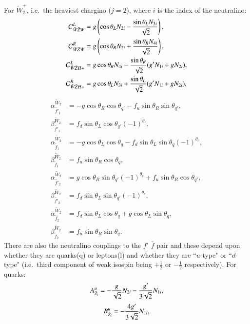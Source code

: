 \documentclass[final,3p,times]{elsarticle}
\begin{document}
For $\tilde{W}^{+}_{2}$, i.e.\ the heaviest chargino ($j = 2$), where $i$ is the index of the neutralino:
\begin{align}
\mathcal{C}_{\tilde{W} \tilde{Z} W}^L &= g\left(\cos\theta_L N_{2i} -
                                        {\sin\theta_L N_{3i} \over \sqrt{2}} \right), \\
\mathcal{C}_{\tilde{W} \tilde{Z} W}^R &= g\left(\cos\theta_R N_{2i} + {\sin\theta_R N_{4i} \over \sqrt{2}}\right), \\
\mathcal{C}_{\tilde{W} \tilde{Z} H+}^L &= g\cos\theta_R N_{4i} - {\sin\theta_R \over \sqrt{2}}(g' N_{1i} + g N_{2i}), \\
\mathcal{C}_{\tilde{W} \tilde{Z} H+}^R &= g\cos\theta_L N_{3i} + {\sin\theta_L \over \sqrt{2}}(g' N_{1i} + g N_{2i}),
\end{align}
\begin{align}
\alpha_{\tilde{f'}_1}^{\tilde{W}_2} &= -g \cos\theta_R \cos\theta_{q'} - f_{u}\sin\theta_{R}\sin\theta_{q'}, \\
\beta_{\tilde{f'}_1}^{\tilde{W}_2} &= f_{d}\sin\theta_L \cos\theta_{q'}(-1)^{\theta_c}, \\
\alpha_{\tilde{f}_1}^{\tilde{W}_2} &= -g\cos\theta_L \cos\theta_q - f_{d}\sin\theta_L \sin\theta_q(-1)^{\theta_c}, \\
\beta_{\tilde{f}_1}^{\tilde{W}_2} &= f_{u}\sin\theta_R \cos\theta_q, \\
\alpha_{\tilde{f'}_2}^{\tilde{W}_2} &= g\cos\theta_R \sin\theta_{q'}(-1)^{\theta_c} + f_{u}\sin\theta_R \cos\theta_{q'}, \\
\beta_{\tilde{f'}_2}^{\tilde{W}_2} &= f_{d}\sin\theta_L \sin\theta_{q'}(-1)^{\theta_c}, \\
\alpha_{\tilde{f}_2}^{\tilde{W}_2} &= f_{d}\sin\theta_{L}\cos\theta_{q} + g\cos\theta_{L}\sin\theta_{q}, \\
\beta_{\tilde{f}_2}^{\tilde{W}_2} &= f_{u}\sin\theta_R\sin\theta_{q}.
\end{align}
There are also the neutralino couplings to the $f'$ $\bar{f}$ pair and these
depend upon whether they are quarks(q) or leptons(l) and whether they are
``$u$-type" or ``$d$-type" (i.e.\ third component of weak isospin being
$+\frac{1}{2}$ or $-\frac{1}{2}$ respectively).  
For quarks:
\begin{equation}
A_{\tilde{Z}_i}^{u} = -{g \over \sqrt{2}}N_{2i} - {g' \over 3 \sqrt{2}}N_{1i},
\end{equation}
\begin{equation}
B_{\tilde{Z}_i}^{u} = -{4 g' \over 3 \sqrt{2}}N_{1i},
\end{equation}
\end{document}
